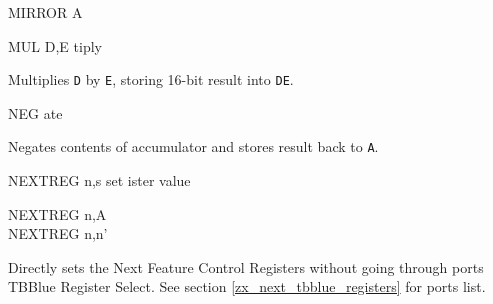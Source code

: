 \documentclass[12pt,twoside,openright,a4paper]{book}
\begin{document}
\begin{basedescript}{
	\desclabelstyle{\multilinelabel}
	\desclabelwidth{3cm}}
\begin{DetailItem}{MIRROR A\ZXN}
	\end{DetailItem}

	\begin{DetailItem}{MUL D,E\ZXN}
		{tiply}
		{\SymMUL}

		Multiplies {\tt D} by {\tt E}, storing 16-bit result into {\tt DE}.

		\begin{DetailEffects}
			\FlagsMULde
		\end{DetailEffects}
				
		\begin{DetailTiming}
			\DetailTime{2}{8}
		\end{DetailTiming}

	\end{DetailItem}

	\begin{DetailItem}{NEG}
		{\IH{NEG}ate}
		{\SymNEG}

		Negates contents of accumulator and stores result back to {\tt A}.

		\begin{DetailEffects}[p]
			\FlagsNEG
		\end{DetailEffects}
				
		\begin{DetailTiming}
		\end{DetailTiming}

	\end{DetailItem}

	\begin{DetailItem}{\small NEXTREG n,s{\scriptsize \ZXN}}
		{set  ister value}
		{\SymNEXTREG{s}}

		\begin{DetailVariants}
			NEXTREG n,A\\
			NEXTREG n,n'
		\end{DetailVariants}

		Directly sets the Next Feature Control Registers without going through ports TBBlue Register Select. See section \ref{zx_next_tbblue_registers} for ports list.

		\begin{DetailEffects}
			\FlagsNEXTREGna
		\end{DetailEffects}		
		
		\begin{DetailTiming}
			\DetailTime[r,A]{4}{17}
			\DetailTime[r,n]{5}{20}
		\end{DetailTiming}

	\end{DetailItem}


\end{basedescript}
\end{document}

